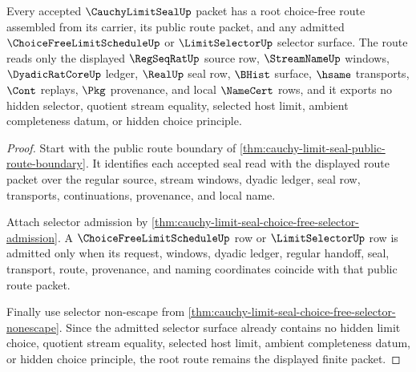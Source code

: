 \begin{theorem}
\label{thm:cauchy-limit-seal-root-choice-free-route}
Every accepted $\CauchyLimitSealUp$ packet has a root choice-free route assembled from its carrier, its public route packet, and any admitted $\ChoiceFreeLimitScheduleUp$ or $\LimitSelectorUp$ selector surface. The route reads only the displayed $\RegSeqRatUp$ source row, $\StreamNameUp$ windows, $\DyadicRatCoreUp$ ledger, $\RealUp$ seal row, $\BHist$ surface, $\hsame$ transports, $\Cont$ replays, $\Pkg$ provenance, and local $\NameCert$ rows, and it exports no hidden selector, quotient stream equality, selected host limit, ambient completeness datum, or hidden choice principle.
\end{theorem}
\begin{proof}
Start with the public route boundary of \autoref{thm:cauchy-limit-seal-public-route-boundary}. It identifies each accepted seal read with the displayed route packet over the regular source, stream windows, dyadic ledger, seal row, transports, continuations, provenance, and local name.

Attach selector admission by \autoref{thm:cauchy-limit-seal-choice-free-selector-admission}. A $\ChoiceFreeLimitScheduleUp$ row or $\LimitSelectorUp$ row is admitted only when its request, windows, dyadic ledger, regular handoff, seal, transport, route, provenance, and naming coordinates coincide with that public route packet.

Finally use selector non-escape from \autoref{thm:cauchy-limit-seal-choice-free-selector-nonescape}. Since the admitted selector surface already contains no hidden limit choice, quotient stream equality, selected host limit, ambient completeness datum, or hidden choice principle, the root route remains the displayed finite packet.
\end{proof}

